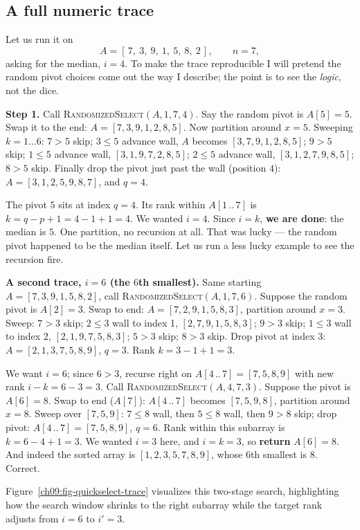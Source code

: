 \subsection{A full numeric trace}

Let us run it on
\[
A = [\,7,\ 3,\ 9,\ 1,\ 5,\ 8,\ 2\,], \qquad n = 7,
\]
asking for the median, $i = 4$. To make the trace reproducible I will pretend the
random pivot choices come out the way I describe; the point is to see the
\emph{logic}, not the dice.

\textbf{Step 1.} Call \textsc{RandomizedSelect}$(A, 1, 7, 4)$. Say the random pivot
is $A[5] = 5$. Swap it to the end: $A = [7,3,9,1,2,8,5]$. Now partition around
$x=5$.
Sweeping $k = 1\ldots 6$: $7 > 5$ skip; $3 \le 5$ advance wall, $A$ becomes
$[3,7,9,1,2,8,5]$; $9>5$ skip; $1\le 5$ advance wall, $[3,1,9,7,2,8,5]$; $2 \le 5$
advance wall, $[3,1,2,7,9,8,5]$; $8>5$ skip. Finally drop the pivot just past the
wall (position $4$): $A = [3,1,2,5,9,8,7]$, and $q = 4$.

The pivot $5$ sits at index $q=4$. Its rank within $A[1\,..\,7]$ is
$k = q - p + 1 = 4 - 1 + 1 = 4$. We wanted $i = 4$. Since $i = k$, \textbf{we are
done}: the median is $5$. One partition, no recursion at all. That was lucky ---
the random pivot happened to be the median itself. Let us run a less lucky example
to see the recursion fire.

\textbf{A second trace, $i = 6$ (the $6$th smallest).} Same starting
$A = [7,3,9,1,5,8,2]$, call \textsc{RandomizedSelect}$(A,1,7,6)$. Suppose the random
pivot is $A[2] = 3$. Swap to end: $A = [7,2,9,1,5,8,3]$, partition around $x=3$.
Sweep: $7>3$ skip; $2\le 3$ wall to index 1, $[2,7,9,1,5,8,3]$; $9>3$ skip;
$1\le3$ wall to index 2, $[2,1,9,7,5,8,3]$; $5>3$ skip; $8>3$ skip. Drop pivot at
index $3$: $A=[2,1,3,7,5,8,9]$, $q = 3$. Rank $k = 3 - 1 + 1 = 3$.

We want $i = 6$; since $6 > 3$, recurse right on $A[4\,..\,7] = [7,5,8,9]$ with new
rank $i - k = 6 - 3 = 3$. Call \textsc{RandomizedSelect}$(A, 4, 7, 3)$. Suppose the
pivot is $A[6] = 8$. Swap to end ($A[7]$): $A[4\,..\,7]$ becomes $[7,5,9,8]$,
partition around $x=8$. Sweep over $[7,5,9]$: $7\le 8$ wall, then $5 \le 8$ wall,
then $9 > 8$ skip; drop pivot: $A[4\,..\,7] = [7,5,8,9]$, $q = 6$. Rank within this
subarray is $k = 6 - 4 + 1 = 3$. We wanted $i = 3$ here, and $i = k = 3$, so
\textbf{return} $A[6] = 8$. And indeed the sorted array is $[1,2,3,5,7,8,9]$, whose
$6$th smallest is $8$. Correct.

Figure~\ref{ch09:fig-quickselect-trace} visualizes this two-stage search, highlighting how
the search window shrinks to the right subarray while the target rank adjusts from $i=6$ to $i'=3$.

